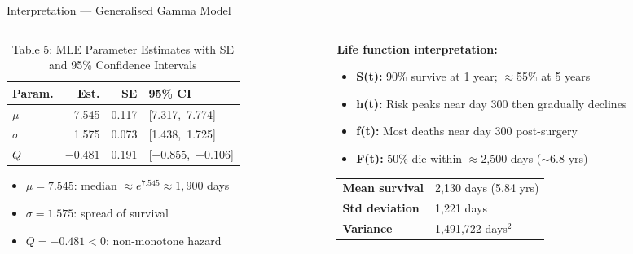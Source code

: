 \documentclass[aspectratio=169, 11pt]{beamer}
\begin{document}
\begin{frame}{Interpretation --- Generalised Gamma Model}

\begin{columns}[T]

  \begin{column}{0.45\textwidth}
    \vspace{2pt}
    \begin{table}
      \caption{Table 5: MLE Parameter Estimates with
               SE and 95\% Confidence Intervals}
      \small
      \begin{tabular}{@{}lrrl@{}}
        \toprule
        \textbf{Param.} & \textbf{Est.} & \textbf{SE}
          & \textbf{95\% CI}\\
        \midrule
        $\mu$    & 7.545    & 0.117
          & [7.317,\ 7.774]\\
        $\sigma$ & 1.575    & 0.073
          & [1.438,\ 1.725]\\
        $Q$      & $-0.481$ & 0.191
          & [$-0.855$,\ $-0.106$]\\
        \bottomrule
      \end{tabular}
    \end{table}
    \vspace{4pt}
    \small
    \begin{itemize}
      \item $\mu{=}7.545$: median
            ${\approx}e^{7.545}{\approx}1{,}900$ days
      \item $\sigma{=}1.575$: spread of survival
      \item $Q{=}{-0.481}{<}0$:
            \alert{non-monotone hazard}
    \end{itemize}
  \end{column}

  \begin{column}{0.52\textwidth}
    \vspace{5pt}
    \small
    \textbf{Life function interpretation:}
    \begin{itemize}
      \item \textbf{S(t):} 90\% survive at 1 year;
            $\approx$55\% at 5 years
      \item \textbf{h(t):} Risk \alert{peaks near day 300}
            then gradually declines
      \item \textbf{f(t):} Most deaths near day 300
            post-surgery
      \item \textbf{F(t):} 50\% die within
            $\approx$2{,}500 days ($\sim$6.8 yrs)
    \end{itemize}
    \vspace{5pt}
    \begin{tabular}{@{}ll@{}}
      \toprule
      \textbf{Mean survival} & 2{,}130 days (5.84 yrs)\\
      \textbf{Std deviation} & 1{,}221 days\\
      \textbf{Variance}      & 1{,}491{,}722 days$^{2}$\\
      \bottomrule
    \end{tabular}
  \end{column}


\end{columns}
\end{frame}
\end{document}
